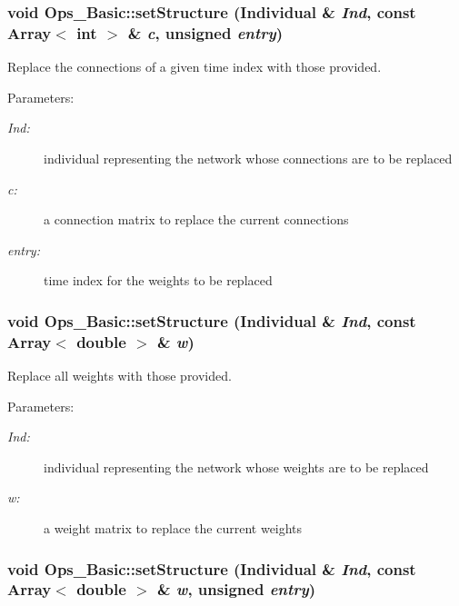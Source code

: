 \subsubsection{\setlength{\rightskip}{0pt plus 5cm}void Ops\_\-Basic::set\-Structure (Individual \& {\em Ind}, const Array$<$ int $>$ \& {\em c}, unsigned {\em entry})}\label{classOps__Basic_a14}


Replace the connections of a given time index with those provided.

\begin{Desc}
\item[Parameters: ]\par
\begin{description}
\item[{\em 
Ind:}]individual representing the network whose connections  are to be replaced \item[{\em 
c:}]a connection matrix to replace the current connections \item[{\em 
entry:}]time index for the weights to be replaced \end{description}
\end{Desc}
\subsubsection{\setlength{\rightskip}{0pt plus 5cm}void Ops\_\-Basic::set\-Structure (Individual \& {\em Ind}, const Array$<$ double $>$ \& {\em w})}\label{classOps__Basic_a13}


Replace all weights with those provided.

\begin{Desc}
\item[Parameters: ]\par
\begin{description}
\item[{\em 
Ind:}]individual representing the network whose weights are to be replaced \item[{\em 
w:}]a weight matrix to replace the current weights \end{description}
\end{Desc}
\subsubsection{\setlength{\rightskip}{0pt plus 5cm}void Ops\_\-Basic::set\-Structure (Individual \& {\em Ind}, const Array$<$ double $>$ \& {\em w}, unsigned {\em entry})}\label{classOps__Basic_a12}


